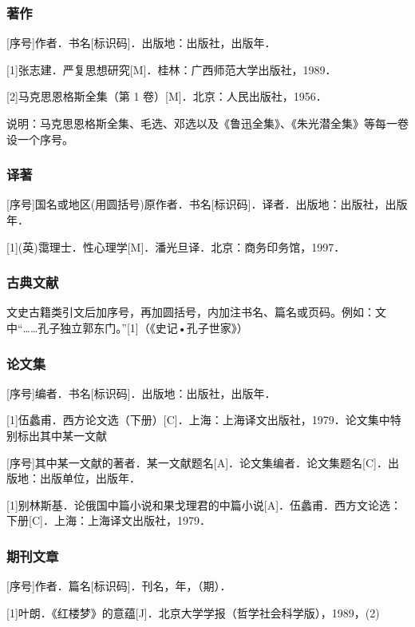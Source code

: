 \documentclass{buaa_fengru}
\begin{document}
\subsubsection{著作}

[序号]作者．书名[标识码]．出版地：出版社，出版年．

[1]张志建．严复思想研究[M]．桂林：广西师范大学出版社，1989．

[2]马克思恩格斯全集（第 1 卷）[M]．北京：人民出版社，1956．

说明：马克思恩格斯全集、毛选、邓选以及《鲁迅全集》、《朱光潜全集》等每一卷设一个序号。

\subsubsection{译著}

[序号]国名或地区(用圆括号)原作者．书名[标识码]．译者．出版地：出版社，出版年．

[1](英)霭理士．性心理学[M]．潘光旦译．北京：商务印务馆，1997．

\subsubsection{古典文献}

文史古籍类引文后加序号，再加圆括号，内加注书名、篇名或页码。例如：文中“……孔子独立郭东门。”[1]（《史记•孔子世家》）

\subsubsection{论文集}

[序号]编者．书名[标识码]．出版地：出版社，出版年．

[1]伍蠡甫．西方论文选（下册）[C]．上海：上海译文出版社，1979．论文集中特别标出其中某一文献

[序号]其中某一文献的著者．某一文献题名[A]．论文集编者．论文集题名[C]．出版地：出版单位，出版年．

[1]别林斯基．论俄国中篇小说和果戈理君的中篇小说[A]．伍蠡甫．西方文论选：下册[C]．上海：上海译文出版社，1979．

\subsubsection{期刊文章}

[序号]作者．篇名[标识码]．刊名，年，（期）．

[1]叶朗．《红楼梦》的意蕴[J]．北京大学学报（哲学社会科学版），1989，(2)
\end{document}

